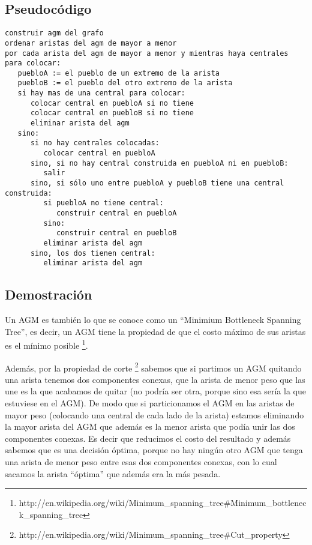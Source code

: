 \subsection{Pseudoc\'odigo}
\begin{verbatim}
construir agm del grafo
ordenar aristas del agm de mayor a menor
por cada arista del agm de mayor a menor y mientras haya centrales para colocar:
   puebloA := el pueblo de un extremo de la arista
   puebloB := el pueblo del otro extremo de la arista
   si hay mas de una central para colocar:
      colocar central en puebloA si no tiene
      colocar central en puebloB si no tiene
      eliminar arista del agm
   sino:
      si no hay centrales colocadas:
         colocar central en puebloA
      sino, si no hay central construida en puebloA ni en puebloB:
         salir
      sino, si sólo uno entre puebloA y puebloB tiene una central construida:
         si puebloA no tiene central:
            construir central en puebloA
         sino:
            construir central en puebloB
         eliminar arista del agm
      sino, los dos tienen central:
         eliminar arista del agm
\end{verbatim}

\subsection{Demostraci\'on}
Un AGM es también lo que se conoce como un ``Minimium Bottleneck Spanning Tree'', es decir, un AGM tiene la propiedad de que el costo máximo de sus aristas
es el mínimo posible \footnote{http://en.wikipedia.org/wiki/Minimum\_spanning\_tree\#Minimum\_bottleneck\_spanning\_tree}.

Además, por la propiedad de corte \footnote{http://en.wikipedia.org/wiki/Minimum\_spanning\_tree\#Cut\_property} sabemos que si partimos un AGM quitando una arista
tenemos dos componentes conexas, que la arista de menor peso que las une es la que acabamos de quitar (no podría ser otra, porque sino esa sería la que estuviese
en el AGM). De modo que si particionamos el AGM en las aristas de mayor peso (colocando una central de cada lado de la arista) estamos eliminando la mayor arista
del AGM que además es la menor arista que podía unir las dos componentes conexas. Es decir que reducimos el costo del resultado y además sabemos que es una decisión óptima, porque no hay ningún otro AGM que tenga una arista de menor peso entre esas dos componentes conexas, con lo cual sacamos la arista ``óptima'' que además era la más pesada.

